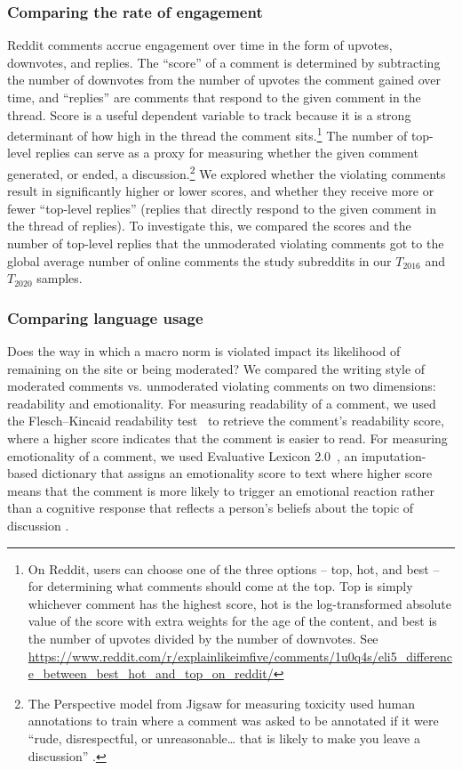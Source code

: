 \subsubsection{Comparing the rate of engagement} 
Reddit comments accrue engagement over time in the form of upvotes, downvotes, and replies. The “score” of a comment is determined by subtracting the number of downvotes from the number of upvotes the comment gained over time, and “replies” are comments that respond to the given comment in the thread. Score is a useful dependent variable to track because it is a strong determinant of how high in the thread the comment sits.\footnote {On Reddit, users can choose one of the three options -- top, hot, and best -- for determining what comments should come at the top. Top is simply whichever comment has the highest score, hot is the log-transformed absolute value of the score with extra weights for the age of the content, and best is the number of upvotes divided by the number of downvotes. See \url{https://www.reddit.com/r/explainlikeimfive/comments/1u0q4s/eli5_difference_between_best_hot_and_top_on_reddit/}} The number of top-level replies can serve as a proxy for measuring whether the given comment generated, or ended, a discussion.\footnote{The Perspective model from Jigsaw for measuring toxicity used human annotations to train where a comment was asked to be annotated if it were “rude, disrespectful, or unreasonable… that is likely to make you leave a discussion” \cite{60_Perspective}.}
We explored whether the violating comments result in significantly higher or lower scores, and whether they receive more or fewer “top-level replies” (replies that directly respond to the given comment in the thread of replies). To investigate this, we compared the scores and the number of top-level replies that the unmoderated violating comments got to the global average number of online comments the study subreddits in our $T_{2016}$ and $T_{2020}$ samples.


\subsubsection{Comparing language usage} 
Does the way in which a macro norm is violated impact its likelihood of remaining on the site or being moderated? We compared the writing style of moderated comments vs. unmoderated violating comments on two dimensions: readability and emotionality. For measuring readability of a comment, we used the Flesch–Kincaid readability test~\cite{64-kinkaid} to retrieve the comment’s readability score, where a higher score indicates that the comment is easier to read. For measuring emotionality of a comment, we used Evaluative Lexicon 2.0~\cite{65_Rocklage, 66_Rocklage}, an imputation-based dictionary that assigns an emotionality score to text where higher score means that the comment is more likely to trigger an emotional reaction rather than a cognitive response that reflects a person’s beliefs about the topic of discussion \cite{66_Rocklage}.
